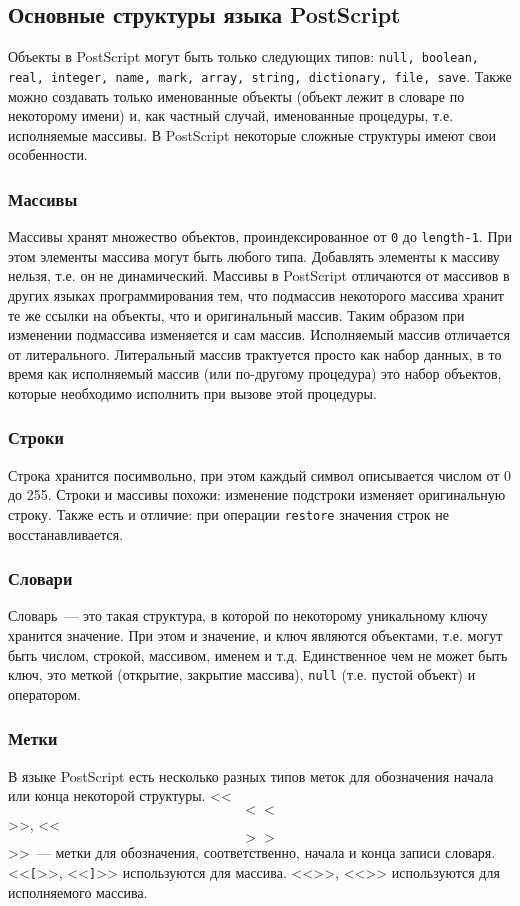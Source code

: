 \documentclass[14pt]{extarticle}
\begin{document}
\subsection{Основные структуры языка PostScript}
Объекты в PostScript могут быть только следующих типов: \texttt{null, boolean, real, integer, name, mark, array, string, dictionary, file, save}. Также можно создавать только именованные объекты (объект лежит в словаре по некоторому имени) и, как частный случай, именованные процедуры, т.е. исполняемые массивы. В PostScript некоторые сложные структуры имеют свои особенности.

\subsubsection*{Массивы}
Массивы хранят множество объектов, проиндексированное от \texttt{0} до \texttt{length-1}. При этом элементы массива могут быть любого типа. Добавлять элементы к массиву нельзя, т.е. он не динамический. Массивы в PostScript отличаются от массивов в других языках программирования тем, что подмассив некоторого массива хранит те же ссылки на объекты, что и оригинальный массив. Таким образом при изменении подмассива изменяется и сам массив. Исполняемый массив отличается от литерального.  Литеральный массив трактуется просто как набор данных, в то время как исполняемый массив (или по-другому процедура) это набор объектов, которые необходимо исполнить при вызове этой процедуры.

\subsubsection*{Строки}
Строка хранится посимвольно, при этом каждый символ описывается числом от 0 до 255. Строки и массивы похожи: изменение подстроки изменяет оригинальную строку. Также есть и отличие: при операции \texttt{restore} значения строк не восстанавливается.

\subsubsection*{Словари}
Словарь~--- это такая структура, в которой по некоторому уникальному ключу хранится значение. При этом и значение, и ключ являются объектами, т.е. могут быть числом, строкой, массивом, именем и т.д. Единственное чем не может быть ключ, это меткой (открытие, закрытие массива), \texttt{null} (т.е. пустой объект) и оператором.

\subsubsection*{Метки}
В языке PostScript есть несколько разных типов меток для обозначения начала или конца некоторой структуры. <<$$<<$$>>, <<$$>>$$>>~--- метки для обозначения, соответственно, начала и конца записи словаря. <<\texttt{[}>>, <<\texttt{]}>> используются для массива. <<\texttt{\textbraceleft}>>, <<\texttt{\textbraceright}>> используются для исполняемого массива.
\end{document}

